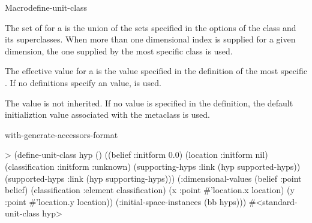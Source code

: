 \documentclass[10pt,twoside,english,pdftex]{article}
\begin{document}
\begin{functiondoc}{Macro}{define-unit-class}
%
%
%

The set of  for a  is the
union of the sets specified in the  options
of the class and its superclasses.  When more than one dimensional
index is supplied for a given dimension, the one supplied by the most
specific class is used.

The effective  value for a
 is the value specified in the definition of the
most specific . If no definitions specify an
 value, \nil{} is used.

The  value is not inherited.  If
no value is specified in the  definition, the
default initializtion value associated with the metaclass is used.

\begin{alsos}{with-generate-accessors-format}
\end{alsos}

\fnexample
\begin{example}
> (define-unit-class hyp ()
    ((belief :initform 0.0)
     (location :initform nil)
     (classification :initform :unknown)
     (supporting-hyps 
      :link (hyp supported-hyps))
     (supported-hyps 
      :link (hyp supporting-hyps)))
    (:dimensional-values 
     (belief :point belief)
     (classification :element classification)
     (x :point #'location.x location)
     (y :point #'location.y location))
    (:initial-space-instances (bb hyps)))
#<standard-unit-class hyp>
\end{example}

\end{functiondoc}

\end{document}
